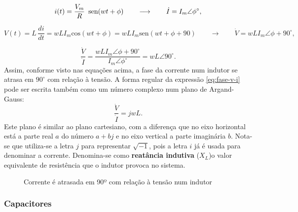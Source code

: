 \[
i(t)=\frac{V_{m}}{R}\mbox{\,\ sen}(wt+\phi)\qquad\longrightarrow\qquad\dot{I}=I_{m}\angle\phi^{\circ},
\]


\[
V(t)=L\,\frac{di}{dt}=wLI_{m}\mbox{cos}(wt+\phi)=wLI_{m}\mbox{sen}(wt+\phi+90)\qquad\longrightarrow\qquad\dot{V}=wLI_{m}\angle\phi+90^{\circ},
\]


\begin{equation}
\frac{\dot{V}}{\dot{I}}=\frac{wLI_{m}\angle\phi+90^{\circ}}{I_{m}\angle\phi^{\circ}}=wL\angle90^{\circ}.\label{eq:fase-v-i}
\end{equation}
Assim, conforme visto nas equações acima, a fase da corrente num indutor
se atrasa em $90^{\circ}$ com relação à tensão. A forma regular da
expressão \ref{eq:fase-v-i} pode ser escrita também como um número
complexo num plano de Argand-Gauss: 
\[
\frac{\dot{V}}{\dot{I}}=jwL.
\]
Este plano é similar ao plano cartesiano, com a diferença que no eixo horizontal está a parte real $a$ do número $a+bj$ e no eixo vertical a parte imaginária $b.$ Nota-se que utiliza-se a letra $j$ para representar $\sqrt{-1}$, pois a letra $i$ já é usada para denominar a corrente. Denomina-se como \textbf{reatância indutiva} ($X_L$)o valor equivalente de resistência que o indutor provoca no sistema. 



\begin{figure}[H]
\begin{center}
\caption{\label{fig:fase-ct-indutor}Corrente é atrasada em 90º com relação à tensão num indutor}
\end{center}
\end{figure}


\subsubsection*{Capacitores}

